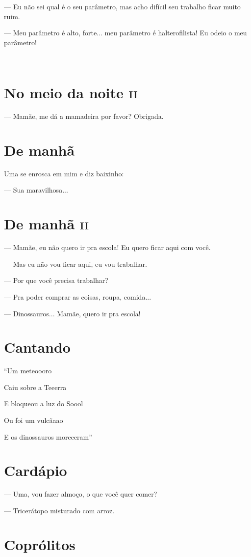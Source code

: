 {— Eu não sei qual é o seu parâmetro, mas acho difícil seu trabalho ficar
muito ruim.

— Meu parâmetro é alto, forte... meu parâmetro é halterofilista! Eu
odeio o meu parâmetro!

 

\chapter{No meio da noite \textsc{ii}}

— Mamãe, me dá a mamadeira por favor? Obrigada.

\chapter{De manhã}

Uma se enrosca em mim e diz baixinho:

— Sua maravilhosa...

\chapter{De manhã \textsc{ii}}

— Mamãe, eu não quero ir pra escola! Eu quero ficar aqui com você.

— Mas eu não vou ficar aqui, eu vou trabalhar.

— Por que você precisa trabalhar?

— Pra poder comprar as coisas, roupa, comida...

— Dinossauros... Mamãe, quero ir pra escola!

\chapter{Cantando}

``Um meteoooro

Caiu sobre a Teeerra

E bloqueou a luz do Soool

Ou foi um vulcãaao

E os dinossauros moreeeram''

\chapter{Cardápio}

— Uma, vou fazer almoço, o que você quer comer?

— Tricerátopo misturado com arroz.

\chapter{Coprólitos}

}
